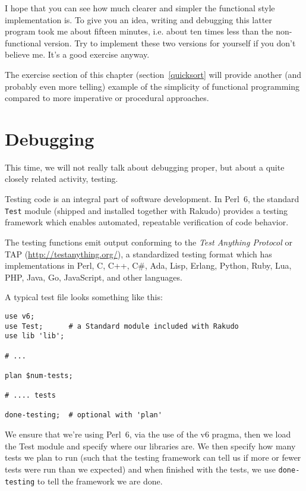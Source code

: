 I hope that you can see how much clearer and simpler the 
functional style implementation is. To give you an idea, 
writing and debugging this latter program took me about 
fifteen minutes, i.e. about ten times less than the 
non-functional version. Try to implement these two versions 
for yourself if you don't believe me. It's a good 
exercise anyway.

The exercise section of this chapter (section~\ref{quicksort} 
will provide another (and probably even more telling) example 
of the simplicity of functional programming compared to more 
imperative or procedural approaches.


\section{Debugging}
\label{test_module}

This time, we will not really talk about debugging proper, 
but about a quite closely related activity, testing.

Testing code is an integral part of software development. In 
Perl~6, the standard {\tt Test} module (shipped and installed 
together with Rakudo) provides a testing framework which enables 
automated, repeatable verification of code behavior.

The testing functions emit output conforming to the \emph{Test 
Anything Protocol} or TAP (\url{http://testanything.org/}), a 
standardized testing format which has implementations in Perl, 
C, C++, C\#, Ada, Lisp, Erlang, Python, Ruby, Lua, PHP, Java, 
Go, JavaScript, and other languages.

A typical test file looks something like this:

\begin{verbatim}
use v6;
use Test;      # a Standard module included with Rakudo
use lib 'lib';

# ...

plan $num-tests;

# .... tests

done-testing;  # optional with 'plan'
\end{verbatim}

We ensure that we're using Perl~6, via the use of the v6 pragma, 
then we load the Test module and specify where our 
libraries are. We then specify how many tests we plan 
to run (such that the testing framework can tell us 
if more or fewer tests were run than we expected) 
and when finished with the tests, we use {\tt done-testing} 
to tell the framework we are done.


